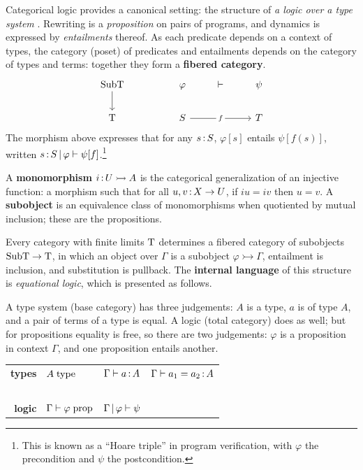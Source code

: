 \documentclass{article}
\begin{document}
Categorical logic provides a canonical setting: the structure of \textit{a logic over a type system} \cite{fibcat}. Rewriting is a \textit{proposition} on pairs of programs, and dynamics is expressed by \textit{entailments} thereof. As each predicate depends on a context of types, the category (poset) of predicates and entailments depends on the category of types and terms: together they form a \textbf{fibered category}.
\[\begin{tikzcd}
	{\mrm{SubT}} && \varphi & \vdash & \psi \\
	{\mrm{T}} && S && T
	\arrow[from=1-1, to=2-1]
	\arrow["f"{description}, from=2-3, to=2-5]
\end{tikzcd}\]
The morphism above expresses that for any $s\,{:}\, S$, $\varphi[s]$ entails $\psi[f(s)]$, written $s\,{:}\, S\,|\, \varphi \vdash \psi[f]$.\footnote{This is known as a ``Hoare triple'' in program verification, with $\varphi$ the precondition and $\psi$ the postcondition.} 


A \textbf{monomorphism} $i\,{:}\, U\rightarrowtail A$ is the categorical generalization of an injective function: a morphism such that for all $u,v\,{:}\, X\to U$, if $iu=iv$ then $u=v$. A \textbf{subobject} is an equivalence class of monomorphisms when quotiented by mutual inclusion; these are the propositions.

Every category with finite limits $\mathrm{T}$ determines a fibered category of subobjects $\mathrm{Sub}\mathrm{T}\to \mathrm{T}$, in which an object over $\Gamma$ is a subobject $\varphi \rightarrowtail \Gamma$, entailment is inclusion, and substitution is pullback. The \textbf{internal language} of this structure is \textit{equational logic}, which is presented as follows.

A type system (base category) has three judgements: $A$ is a type, $a$ is of type $A$, and a pair of terms of a type is equal. A logic (total category) does as well; but for propositions equality is free, so there are two judgements: $\varphi$ is a proposition in context $\Gamma$, and one proposition entails another.

\begin{center}
    \begin{tabular}{r@{\qquad}lll}
         \textbf{types} & $A\; \mathrm{type}$ & $\Gamma\vdash a\,{:}\, A$ & $\Gamma\vdash a_1= a_2\,{:}\, A$\\~\\
         \textbf{logic} & $\Gamma\vdash \varphi\;\mathrm{prop}$ & $\Gamma\,|\, \varphi\vdash \psi$
    \end{tabular}
\end{center}
\end{document}
